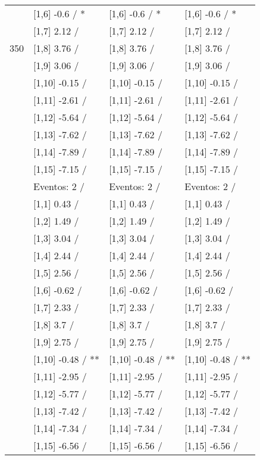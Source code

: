 \begin{table}
\begin{tabular}[t]{llll}
 & {}[1,6] -0.6  / * & {}[1,6] -0.6  / * & {}[1,6] -0.6  / *\\
 & {}[1,7] 2.12  / & {}[1,7] 2.12  / & {}[1,7] 2.12  /\\
350 & {}[1,8] 3.76  / & {}[1,8] 3.76  / & {}[1,8] 3.76  /\\
\addlinespace
 & {}[1,9] 3.06  / & {}[1,9] 3.06  / & {}[1,9] 3.06  /\\
 & {}[1,10] -0.15  / & {}[1,10] -0.15  / & {}[1,10] -0.15  /\\
 & {}[1,11] -2.61  / & {}[1,11] -2.61  / & {}[1,11] -2.61  /\\
 & {}[1,12] -5.64  / & {}[1,12] -5.64  / & {}[1,12] -5.64  /\\
 & {}[1,13] -7.62  / & {}[1,13] -7.62  / & {}[1,13] -7.62  /\\
\addlinespace
 & {}[1,14] -7.89  / & {}[1,14] -7.89  / & {}[1,14] -7.89  /\\
 & {}[1,15] -7.15  / & {}[1,15] -7.15  / & {}[1,15] -7.15  /\\
 & Eventos:  2 / & Eventos:  2 / & Eventos:  2 /\\
 & {}[1,1] 0.43  / & {}[1,1] 0.43  / & {}[1,1] 0.43  /\\
 & {}[1,2] 1.49  / & {}[1,2] 1.49  / & {}[1,2] 1.49  /\\
\addlinespace
 & {}[1,3] 3.04  / & {}[1,3] 3.04  / & {}[1,3] 3.04  /\\
 & {}[1,4] 2.44  / & {}[1,4] 2.44  / & {}[1,4] 2.44  /\\
 & {}[1,5] 2.56  / & {}[1,5] 2.56  / & {}[1,5] 2.56  /\\
 & {}[1,6] -0.62  / & {}[1,6] -0.62  / & {}[1,6] -0.62  /\\
 & {}[1,7] 2.33  / & {}[1,7] 2.33  / & {}[1,7] 2.33  /\\
\addlinespace
500 & {}[1,8] 3.7  / & {}[1,8] 3.7  / & {}[1,8] 3.7  /\\
 & {}[1,9] 2.75  / & {}[1,9] 2.75  / & {}[1,9] 2.75  /\\
 & {}[1,10] -0.48  / ** & {}[1,10] -0.48  / ** & {}[1,10] -0.48  / **\\
 & {}[1,11] -2.95  / & {}[1,11] -2.95  / & {}[1,11] -2.95  /\\
 & {}[1,12] -5.77  / & {}[1,12] -5.77  / & {}[1,12] -5.77  /\\
\addlinespace
 & {}[1,13] -7.42  / & {}[1,13] -7.42  / & {}[1,13] -7.42  /\\
 & {}[1,14] -7.34  / & {}[1,14] -7.34  / & {}[1,14] -7.34  /\\
 & {}[1,15] -6.56  / & {}[1,15] -6.56  / & {}[1,15] -6.56  /\\
\bottomrule
\end{tabular}
\end{table}
